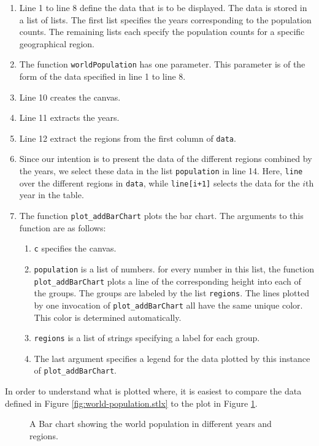 \begin{enumerate}
\item Line 1 to line 8 define the data that is to be displayed.  The data is stored in a list of
      lists.  The first list specifies the years corresponding to the population counts.
      The remaining lists each specify the population counts for a specific geographical region.
\item The function \texttt{worldPopulation} has one parameter.  This parameter is of the form of the
      data specified in line 1 to line 8.
\item Line 10 creates the canvas.
\item Line 11 extracts the years.
\item Line 12 extract the regions from the first column of \texttt{data}.
\item Since our intention is to present the data of the different regions combined by the years, 
      we select these data in the list \texttt{population} in line 14.  Here, \texttt{line} over the
      different regions in \texttt{data}, while \texttt{line[i+1]} selects the data for the $i$th
      year in the table.
\item The function \texttt{plot\_addBarChart} plots the bar chart. The arguments to this function 
      are as follows:
      \begin{enumerate}
      \item \texttt{c} specifies  the canvas.
      \item \texttt{population} is a list of numbers.  for every number in this list, the function 
            \texttt{plot\_addBarChart} plots a line of the corresponding height into each of the
            groups.  The groups are labeled by the list \texttt{regions}.  The lines plotted by one
            invocation of \texttt{plot\_addBarChart} all have the same unique color.  This color is
            determined automatically.
      \item \texttt{regions} is a list of strings specifying a label for each group.
      \item The last argument specifies a legend for the data plotted by this instance of 
            \texttt{plot\_addBarChart}.
      \end{enumerate}
\end{enumerate}
In order to understand what is plotted where, it is easiest to compare the data defined in Figure
\ref{fig:world-population.stlx} to the plot in Figure \ref{fig:world-population.eps}.


\begin{figure}[!ht]
  \centering
  \caption{A Bar chart showing the world population in different years and regions.}
  \label{fig:world-population.eps}
\end{figure}


